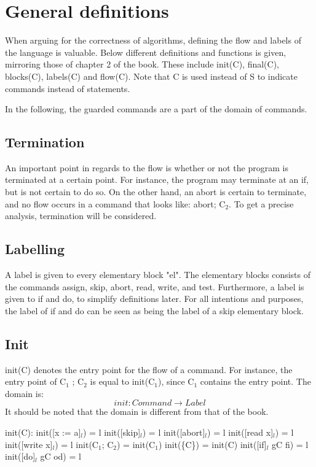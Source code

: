 
\section{General definitions}

\docpar
When arguing for the correctness of algorithms, defining the flow and labels of the language is
valuable. Below different definitions and functions is given, mirroring those of chapter 2 of the
book. These include init(C), final(C), blocks(C), labels(C) and flow(C). Note that C is used instead
of S to indicate commands instead of statements.

In the following, the guarded commands are a part of the domain of commands.

\subsection{Termination}

An important point in regards to the flow is whether or not the program is terminated
at a certain point. For instance, the program may terminate at an if, but is not
certain to do so. On the other hand, an abort is certain to terminate, and no flow
occurs in a command that looks like: abort; C$_2$. To get a precise analysis, termination
will be considered.

\subsection{Labelling}

A label is given to every elementary block "el". The elementary blocks consists of
the commands assign, skip, abort, read, write, and test. Furthermore, a label is given
to if and do, to simplify definitions later. For all intentions and purposes, the
label of if and do can be seen as being the label of a skip elementary block.

\subsection{Init}

init(C) denotes the entry point for the flow of a command.
For instance, the entry point of C$_1$ ; C$_2$ is equal to init(C$_1$),
since C$_1$ contains the entry point. The domain is:
\[init \colon Command \to Label\]
It should be noted that the domain is different from that of the book.

init(C):\newline
init([x := a]$_l$)      = l\newline
init([skip]$_l$)        = l\newline
init([abort]$_l$)       = l\newline
init([read x]$_l$)      = l\newline
init([write x]$_l$)     = l\newline
init(C$_1$; C$_2$)        = init(C$_1$)\newline
init(\{C\})             = init(C)\newline
init([if]$_l$ gC fi)        = l\newline
init([do]$_l$ gC od)        = l\newline

